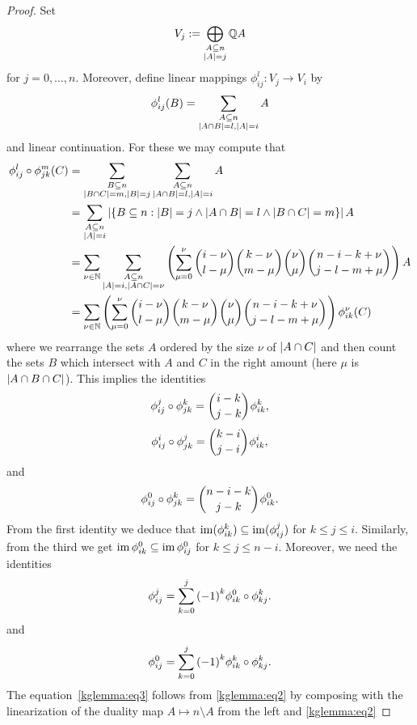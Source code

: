 \begin{proof}
  Set 
  $$
  V_j:=\bigoplus_{\substack{A\subseteq n\\ \left\vert{A}\right\vert=j}}{\mathbb{Q} A}
  $$
  for $j=0,\ldots,n$.
  Moreover, define linear mappings $\phi^l_{ij}:V_j\to V_i$ by
  $$
  \phi^l_{ij}(B) = \sum_{\substack{A\subseteq n\\ \left\vert{A\cap B}\right\vert=l, \left\vert{A}\right\vert=i}}{A}
  $$
  and linear continuation.
  For these we may compute that
  \begin{align*}
      \phi^l_{ij}\compose\phi^m_{jk}(C)
      &= \sum_{\substack{B\setleq n\\ \card{B\setmeet C}=m, \card{B}=j}}{\sum_{\substack{A\setleq n\\ \card{A\setmeet B}=l, \card{A}=i}}{A}}\\
      & = \sum_{\substack{A\setleq n\\ \card{A}=i}}{\card{\{B\setleq n: \card{B}=j\lgand\card{A\setmeet B}=l\lgand\card{B\setmeet C}=m\}}{A}}\\
      & = \sum_{\nu\in\nats}{\sum_{\substack{A\setleq n\\ \card{A}=i, \card{A\setmeet C}=\nu}}{\left(\sum_{\mu=0}^{\nu}{\binom{i-\nu}{l-\mu}\binom{k-\nu}{m-\mu}\binom{\nu}{\mu}\binom{n-i-k+\nu}{j-l-m+\mu}}\right)A}}\\
      & = \sum_{\nu\in\nats}{\left(\sum_{\mu=0}^{\nu}{\binom{i-\nu}{l-\mu}\binom{k-\nu}{m-\mu}\binom{\nu}{\mu}\binom{n-i-k+\nu}{j-l-m+\mu}}\right)\phi^{\nu}_{ik}(C)}
  \end{align*}
  where we rearrange the sets $A$ ordered by the size $\nu$ of $\left\vert{A\cap C}\right\vert$ and then count the sets $B$ which intersect with $A$ and $C$ in the right amount (here $\mu$ is $\left\vert{A\cap B\cap C}\right\vert$).
  This implies the identities
  $$
  \phi^j_{ij}\compose\phi^k_{jk} = \binom{i-k}{j-k}\phi^k_{ik},
  $$
  $$
  \phi^i_{ij}\compose\phi^j_{jk} = \binom{k-i}{j-i}\phi^i_{ik},
  $$
  and
  $$
  \phi^0_{ij}\compose\phi^k_{jk} = \binom{n-i-k}{j-k}\phi^0_{ik}.\label{kglemma:eq1}
  $$
  From the first identity we deduce that $\mathop\mathrm{im}(\phi^k_{ik})\subseteq\mathop\mathrm{im}(\phi^j_{ij})$ for $k\leq j\leq i$. Similarly, from the third we get $\mathop\mathrm{im}\phi_{ik}^0\subseteq\mathop\mathrm{im}\phi_{ij}^0$ for $k\leq j\leq n-i$.
  Moreover, we need the identities
  $$
  \phi^j_{ij}=\sum_{k=0}^{j}{{(-1)}^k\phi^0_{ik}\circ\phi^k_{kj}}.\label{kglemma:eq2}
  $$
  and
  $$
  \phi_{ij}^0=\sum_{k=0}^j{{(-1)}^k\phi_{ik}^k\circ\phi_{kj}^k}.\label{kglemma:eq3}
  $$
  The equation~\autoref{kglemma:eq3}
  follows from \autoref{kglemma:eq2}
  by composing with the linearization of the duality map $A\mapsto n\setminus A$ from the left and \autoref{kglemma:eq2}

\end{proof}
